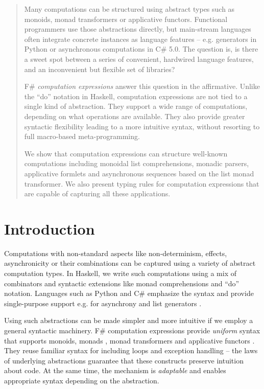 \documentclass[runningheads,a4paper]{llncs}
\begin{document}
\begin{abstract}
Many computations can be structured using abstract types such as monoids, monad transformers or 
applicative functors. Functional programmers use those abstractions directly, but main-stream
languages often integrate concrete instances as language features -- e.g. generators in Python
or asynchronous computations in C\# 5.0. The question is, is there a sweet spot between a series of
convenient, hardwired language features, and an inconvenient but flexible set of libraries?

\quad F\# \emph{computation expressions} answer this question in the affirmative. Unlike 
the ``do'' notation in Haskell, computation expressions are not tied to a single kind of abstraction.
They support a wide range of computations, depending on what operations are available. They also 
provide greater syntactic flexibility leading to a more intuitive syntax, without resorting to 
full macro-based meta-programming. 

\quad We show that computation expressions can structure well-known computations including monoidal 
list comprehensions, monadic parsers, applicative formlets and asynchronous sequences based on the 
list monad transformer. We also present typing rules for computation expressions that are capable of 
capturing all these applications. 

\end{abstract}


\section{Introduction}
Computations with non-standard aspects like non-determinism, effects, asynchronicity or their
combinations can be captured using a variety of abstract computation types. In Haskell, we write 
such computations using a mix of combinators and syntactic extensions like monad comprehensions 
\cite{monad-compre} and ``do'' notation. Languages such as Python and C\# emphasize the syntax 
and provide single-purpose support e.g. for asynchrony \cite{cs-async} and list generators
\cite{csharp-iterators}. 

Using such abstractions can be made simpler and more intuitive 
if we employ a general syntactic machinery. F\# computation expressions provide
\emph{uniform} syntax that supports monoids, monads \cite{monads-fp}, monad transformers 
\cite{monad-transformers} and applicative functors \cite{applicative}. They reuse familiar 
syntax for including loops and exception handling -- the laws of underlying
abstractions guarantee that these constructs preserve intuition about code. At the same time, 
the mechanism is \emph{adaptable} and enables appropriate syntax depending on the abstraction.
\end{document}
